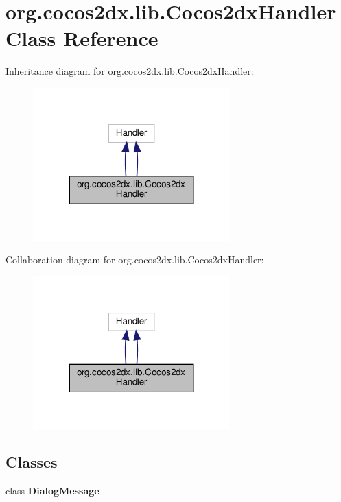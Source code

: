 \hypertarget{classorg_1_1cocos2dx_1_1lib_1_1Cocos2dxHandler}{}\section{org.\+cocos2dx.\+lib.\+Cocos2dx\+Handler Class Reference}
\label{classorg_1_1cocos2dx_1_1lib_1_1Cocos2dxHandler}


Inheritance diagram for org.\+cocos2dx.\+lib.\+Cocos2dx\+Handler\+:
\nopagebreak
\begin{figure}[H]
\begin{center}
\leavevmode
\includegraphics[width=215pt]{classorg_1_1cocos2dx_1_1lib_1_1Cocos2dxHandler__inherit__graph}
\end{center}
\end{figure}


Collaboration diagram for org.\+cocos2dx.\+lib.\+Cocos2dx\+Handler\+:
\nopagebreak
\begin{figure}[H]
\begin{center}
\leavevmode
\includegraphics[width=215pt]{classorg_1_1cocos2dx_1_1lib_1_1Cocos2dxHandler__coll__graph}
\end{center}
\end{figure}
\subsection*{Classes}
\begin{DoxyCompactItemize}
\item 
class {\bfseries Dialog\+Message}
\end{DoxyCompactItemize}
